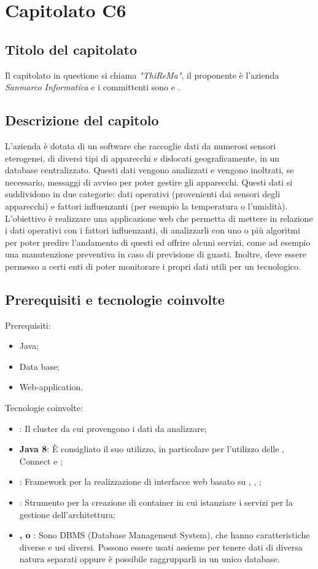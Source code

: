 \section{Capitolato C6}
\subsection{Titolo del capitolato}
Il capitolato in questione si chiama \textit{"ThiReMa"}, il proponente \`e l'azienda \textit{Sanmarco Informatica} e i committenti sono \VT{} e \CR{}.

\subsection{Descrizione del capitolo}
L'azienda \`e dotata di un software che raccoglie dati da numerosi sensori eterogenei, di diversi tipi di apparecchi e dislocati geograficamente, in un database centralizzato. Questi dati vengono analizzati e vengono inoltrati, se necessario, messaggi di avviso per poter gestire gli apparecchi. Questi dati si suddividono in due categorie: dati operativi (provenienti dai sensori degli apparecchi) e fattori influenzanti (per esempio la temperatura o l'umidità).
L'obiettivo \`e realizzare una applicazione web che permetta di mettere in relazione i dati operativi con i fattori influenzanti, di analizzarli con uno o più algoritmi per poter predire l'andamento di questi ed offrire alcuni servizi, come ad esempio una manutenzione preventiva in caso di previsione di guasti. Inoltre, deve essere permesso a certi enti di poter monitorare i propri dati utili per un  tecnologico.


\subsection{Prerequisiti e tecnologie coinvolte}
Prerequisiti:
\begin{itemize}
\item Java;	
\item Data base;
\item Web-application.
\end{itemize}
Tecnologie coinvolte:
\begin{itemize}
\item \textbf{}: Il cluster da cui provengono i dati da analizzare;
\item \textbf{Java 8}: È consigliato il suo utilizzo, in particolare per l'utilizzo delle  , Connect e ;
\item \textbf{}: Framework per la realizzazione di interfacce web basato su , , ;
\item \textbf{}: Strumento per la creazione di container in cui istanziare i servizi per la gestione dell'architettura;
\item \textbf{,  o }: Sono DBMS (Database Management System), che hanno caratteristiche diverse e usi diversi. Possono essere usati assieme per tenere dati di diversa natura separati oppure \`e possibile raggrupparli in un unico database.
\end{itemize}


